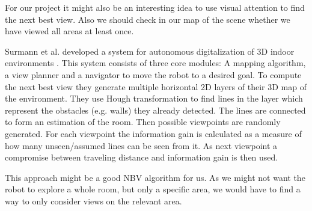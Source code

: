 \documentclass[a4paper,11pt,english]{article}
\begin{document}
For our project it might also be an interesting idea to use visual attention to find the next best view.
Also we should check in our map of the scene whether we have viewed all areas at least once.\medskip

Surmann et al. developed a system for autonomous digitalization of 3D indoor environments \cite{surmann2003autonomous}.
This system consists of three core modules: A mapping algorithm, a view planner and a navigator to move the robot to a desired goal.
To compute the next best view they generate multiple horizontal 2D layers of their 3D map of the environment.
They use Hough transformation to find lines in the layer which represent the obstacles (e.g. walls) they already detected.
The lines are connected to form an estimation of the room. Then possible viewpoints are randomly generated.
For each viewpoint the information gain is calculated as a measure of how many unseen/assumed lines can be seen from it.
As next viewpoint a compromise between traveling distance and information gain is then used.

This approach might be a good NBV algorithm for us. As we might not want the robot to explore a whole room, but only a specific area, we would have to find a way to only consider views on the relevant area.

%
%
\end{document}
